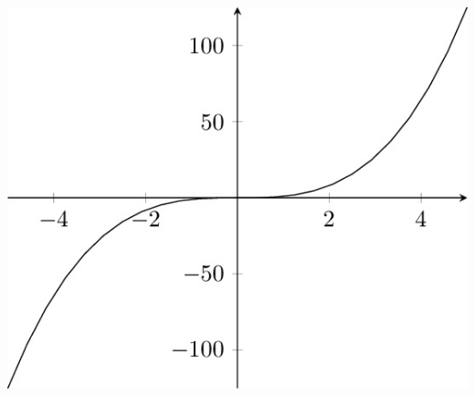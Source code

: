 \documentclass{ximera}
\begin{document}
\begin{image}
\includegraphics[scale=.3]{00001}
\end{image}
\end{document}

